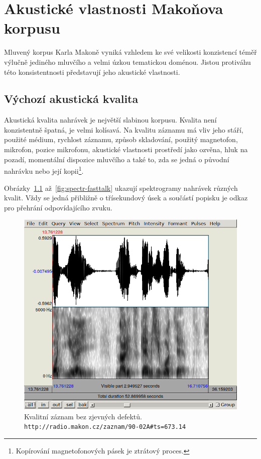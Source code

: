 \chapter{Akustické vlastnosti Makoňova korpusu}
\label{kap:akustika}

Mluvený korpus Karla Makoně vyniká vzhledem ke své velikosti konzistencí téměř
výlučně jediného mluvčího a velmi úzkou tematickou doménou. Jistou protiváhu
této konsistentnosti představují jeho akustické vlastnosti.

\section{Výchozí akustická kvalita}

Akustická kvalita nahrávek je největší slabinou korpusu. Kvalita není
konzistentně špatná, je velmi kolísavá. Na kvalitu záznamu má vliv jeho stáří,
použité médium, rychlost záznamu, způsob skladování, použitý
magnetofon, mikrofon, pozice mikrofonu, akustické vlastnosti prostředí jako
ozvěna, hluk na pozadí, momentální dispozice mluvčího a také to, zda se jedná o
původní nahrávku nebo její kopii\footnote{Kopírování magnetofonových pásek je ztrátový proces.}.

Obrázky~\ref{fig:spectr-ok} až~\ref{fig:spectr-fasttalk} ukazují spektrogramy
nahrávek různých kvalit. Vždy se jedná přibližně o třísekundový úsek a součástí
popisku je odkaz pro přehrání odpovídajícího zvuku.

\begin{figure}[htpb]
\includegraphics[scale=0.89]{rc/spectrum-dobry-90-02A.png}
\caption{
    Kvalitní záznam bez zjevných defektů.\\
    \texttt{http://radio.makon.cz/zaznam/90-02A\#ts=673.14}
}
\label{fig:spectr-ok}
\end{figure}

